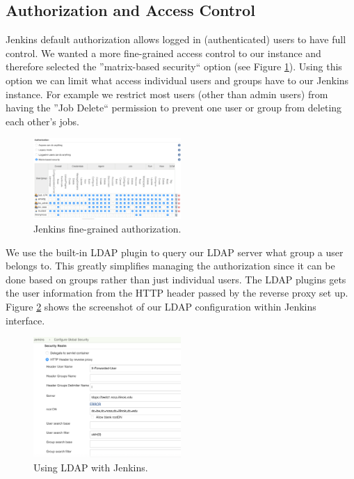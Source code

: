 \documentclass[10pt, conference, compsocconf]{IEEEtran}
\begin{document}
\subsection{Authorization and Access Control}
\label{subsec:authorization}

Jenkins default authorization allows logged in (authenticated) users to have full control. 
We wanted a more fine-grained access control to our instance and therefore selected the ''matrix-based security`` option (see Figure \ref{fig:jenkinsAuthorization}). Using this option we can limit what access individual users and groups have to our Jenkins instance. 
For example we restrict most users (other than admin users) from having the ''Job Delete`` permission to prevent one user or group from deleting each other's jobs. 

\begin{figure}[h]
\centering
\includegraphics[width=0.5\textwidth]{Configure-Global-Security}
\caption{Jenkins fine-grained authorization.}
\label{fig:jenkinsAuthorization}
\end{figure}

We use the built-in LDAP plugin to query our LDAP server what group a user belongs to.
This greatly simplifies managing the authorization since it can be done based on groups rather than just individual users. 
The LDAP plugins gets the user information from the HTTP header passed by the reverse proxy set up. 
Figure \ref{fig:LDAP-Jenkins} shows the screenshot of our LDAP configuration within Jenkins interface.

\begin{figure}
\centering
\includegraphics[width=0.5\textwidth]{LDAP-Jenkins}
\caption{Using LDAP with Jenkins.}
\label{fig:LDAP-Jenkins}
\end{figure}
\end{document}
